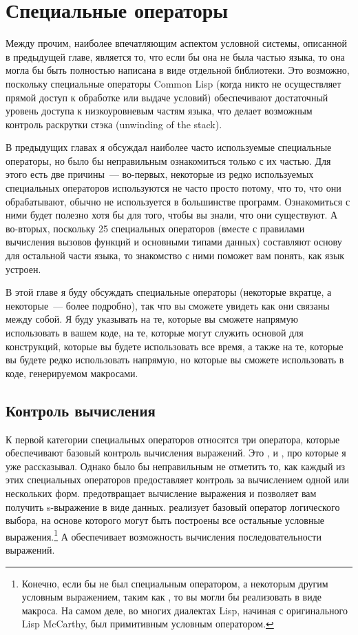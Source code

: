 \chapter{Специальные операторы}
\label{ch:20}

Между прочим, наиболее впечатляющим аспектом условной системы, описанной в предыдущей
главе, является то, что если бы она не была частью языка, то она могла бы быть полностью
написана в виде отдельной библиотеки.  Это возможно, поскольку специальные операторы
Common Lisp (когда никто не осуществляет прямой доступ к обработке или выдаче условий)
обеспечивают достаточный уровень доступа к низкоуровневым частям языка, что делает
возможным контроль раскрутки стэка (unwinding of the stack).

В предыдущих главах я обсуждал наиболее часто используемые специальные операторы, но было
бы неправильным ознакомиться только с их частью.  Для этого есть две причины~--- во-первых,
некоторые из редко используемых специальных операторов используются не часто просто
потому, что то, что они обрабатывают, обычно не используется в большинстве программ.
Ознакомиться с ними будет полезно хотя бы для того, чтобы вы знали, что они существуют.  А
во-вторых, поскольку 25 специальных операторов (вместе с правилами вычисления вызовов
функций и основными типами данных) составляют основу для остальной части языка, то
знакомство с ними поможет вам понять, как язык устроен.

В этой главе я буду обсуждать специальные операторы (некоторые вкратце, а некоторые~---
более подробно), так что вы сможете увидеть как они связаны между собой.  Я буду указывать
на те, которые вы сможете напрямую использовать в вашем коде, на те, которые могут служить
основой для конструкций, которые вы будете использовать все время, а также на те, которые
вы будете редко использовать напрямую, но которые вы сможете использовать в коде,
генерируемом макросами.

\section{Контроль вычисления}

К первой категории специальных операторов относятся три оператора, которые обеспечивают
базовый контроль вычисления выражений. Это ,  и , про
которые я уже рассказывал.  Однако было бы неправильным не отметить то, как каждый из этих
специальных операторов предоставляет контроль за вычислением одной или нескольких форм.
 предотвращает вычисление выражения и позволяет вам получить s-выражение в
виде данных.  реализует базовый оператор логического выбора, на основе которого
могут быть построены все остальные условные выражения.\footnote{Конечно, если бы 
  не был специальным оператором, а некоторым другим условным выражением, таким как
  , то вы могли бы реализовать  в виде макроса.  На самом деле, во
  многих диалектах Lisp, начиная с оригинального Lisp McCarthy,  был
  примитивным условным оператором.}  А  обеспечивает возможность вычисления
последовательности выражений.

